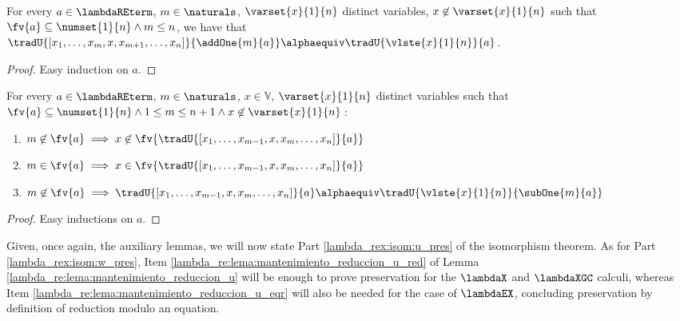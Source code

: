 \begin{lemma}\label{lambda_re:lema:u_incrementos}
For every $a \in \lambdaREterm$, $m \in \naturals$, $\varset{x}{1}{n}$ distinct variables, $x \not\in \varset{x}{1}{n}$ such that \\
$\fv{a} \subseteq \numset{1}{n} \land m \leq n$, we have that
$\tradU{\left[ x_1, \ldots, x_m, x, x_{m+1}, \ldots, x_n \right]}{\addOne{m}{a}} \alphaequiv \tradU{\vlste{x}{1}{n}}{a}$.
    \begin{proof}
    Easy induction on $a$.
    \end{proof}
\end{lemma}

\begin{lemma}\label{lambda_regc:lema:u_gc}
For every $a \in \lambdaREterm$, $m \in \naturals$, $x \in \mathbb{V}$,
$\varset{x}{1}{n}$ distinct variables such that $\fv{a} \subseteq \numset{1}{n} \land 1
\leq m \leq n+1 \land x \not\in \varset{x}{1}{n} \,$:
    \begin{enumerate}
        \item \label{lambda_regc:lema:u_gc:not} $m \not\in \fv{a} \implies x \not\in \fv{\tradU{\left[ x_1,
        \ldots, x_{m-1}, x, x_m, \ldots, x_n \right]}{a}}$

        \item \label{lambda_regc:lema:u_gc:in} $m \in \fv{a} \implies x \in \fv{\tradU{\left[ x_1,
        \ldots, x_{m-1}, x, x_m, \ldots, x_n \right]}{a}}$

        \item \label{lambda_regc:lema:u_gc:dec} $m \not\in \fv{a} \implies \tradU{\left[ x_1, \ldots, x_{m-1}, x,
        x_m, \ldots, x_n \right]}{a} \alphaequiv
        \tradU{\vlste{x}{1}{n}}{\subOne{m}{a}}$
    \end{enumerate}
    \begin{proof}
    Easy inductions on $a$.
    \end{proof}
\end{lemma}

Given, once again, the auxiliary lemmas, we will now state Part
\ref{lambda_rex:isom:u_pres} of the isomorphism theorem. As for Part
\ref{lambda_rex:isom:w_pres}, Item
\ref{lambda_re:lema:mantenimiento_reduccion_u_red} of Lemma
\ref{lambda_re:lema:mantenimiento_reduccion_u} will be enough to prove
preservation for the $\lambdaX$ and $\lambdaXGC$ calculi, whereas Item
\ref{lambda_re:lema:mantenimiento_reduccion_u_eqr} will also be needed for the
case of $\lambdaEX$, concluding preservation by definition of reduction modulo
an equation.


